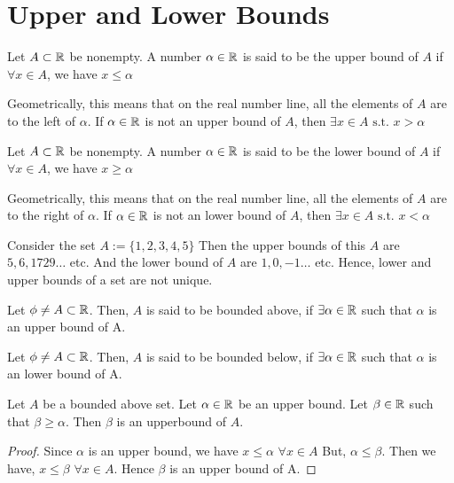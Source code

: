 \documentclass{scrartcl}
\begin{document}
    \section{Upper and Lower Bounds}
    \begin{definition}
        Let $A \subset \mathbb{R}$ be nonempty. A number $\alpha \in \mathbb{R}$ is said to be the upper bound of $A$ if $\forall x \in A$, we have $x \leq \alpha$
    \end{definition}
    Geometrically, this means that on the real number line, all the elements of $A$ are to the left of $\alpha$. If $\alpha \in \mathbb{R}$ is not an upper bound of $A$, then $\exists x \in A \text{ s.t. } x > \alpha$
    \begin{definition}
        Let $A \subset \mathbb{R}$ be nonempty. A number $\alpha \in \mathbb{R}$ is said to be the lower bound of $A$ if $\forall x \in A$, we have $x \geq \alpha$
    \end{definition}
    Geometrically, this means that on the real number line, all the elements of $A$ are to the right of $\alpha$. If $\alpha \in \mathbb{R}$ is not an lower bound of $A$, then $\exists x \in A \text{ s.t. } x < \alpha$
    \begin{example}
        Consider the set $A := \{1, 2, 3, 4, 5\}$ Then the upper bounds of this $A$ are $5, 6, 1729 \dots$ etc.
        And the lower bound of $A$ are $1, 0, -1 \dots$ etc. Hence, lower and upper bounds of a set are not unique.
    \end{example}
    \begin{definition}
        Let $\phi \neq A \subset \mathbb{R}$. Then, $A$ is said to be bounded above, if $\exists \alpha \in \mathbb{R}$ such that $\alpha$ is an upper bound of A.
    \end{definition}
    \begin{definition}
        Let $\phi \neq A \subset \mathbb{R}$. Then, $A$ is said to be bounded below, if $\exists \alpha \in \mathbb{R}$ such that $\alpha$ is an lower bound of A.
    \end{definition}
    \begin{theorem}
        Let $A$ be a bounded above set. Let $\alpha \in \mathbb{R}$ be an upper bound. Let $\beta \in \mathbb{R}$ such that 
        $\beta \geq \alpha$. Then $\beta$ is an upperbound of $A$.
        \begin{proof}
            Since $\alpha$ is an upper bound, we have $x \leq \alpha \,\, \forall x \in A$
            But, $\alpha \leq \beta$. Then we have, $x \leq \beta \,\, \forall x \in A$.
            Hence $\beta$ is an upper bound of A.
        \end{proof}
    \end{theorem}
\end{document}
